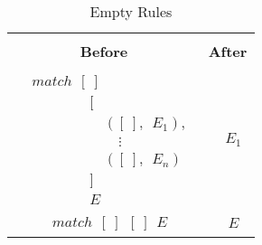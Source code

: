 \documentclass[11pt]{article}
\begin{document}
\begin{table}[h!]
\begin{center}
\begin{tabular}{|c|c|} \hline
{}& {}\\
{\bf Before} & {\bf After} \\ 
{}& {}\\
\hline
\begin{minipage}{2in}
{
\begin{align*}
&match~~[~] \\
&\qquad\qquad \Big [ \\ 
&\qquad\qquad\quad ([~],~~E_1),\\ 
&\qquad\qquad\quad \quad \vdots \\ 
&\qquad\qquad\quad ([~],~~E_n) \\
&\qquad\qquad \Big ]\\
&\qquad\qquad E
\end{align*} 
} 
\end {minipage} &
\begin{minipage}{1.5in}
{
\begin{align*} 
& E_1
\end{align*}
}
\end {minipage}\\ 
\hline 

\begin{minipage}{2in}
{
\begin{align*}
&match~~[~]~~[~]~~E
\end{align*} 
} 
\end {minipage} &
\begin{minipage}{1.5in}
{
\begin{align*} 
& E
\end{align*}
}
\end {minipage}


\tabularnewline
\hline

\end{tabular}
\caption{Empty Rules}
\label{Pmatch:Normalform}
\end{center}
\end{table}
\end{document}
